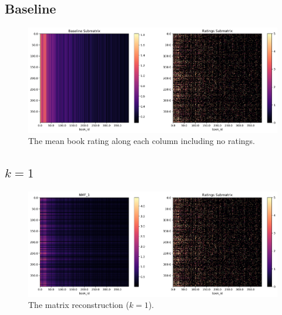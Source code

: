 \documentclass[handout]{beamer}
\begin{document}
\subsection{Baseline}\label{baseline}


\begin{frame}
 \begin{figure}[t]
    \includegraphics[width=\linewidth]{../image/goodreads-models/baseline-matrix.png}
    \caption[Baseline matrix]{The mean book rating along each column including no ratings.}
     \label{fig:baseline-matrix}
\end{figure}
\end{frame}

\subsection{$k=1$}\label{k-1}

\begin{frame}
 \begin{figure}[t]
    \includegraphics[width=\linewidth]{../image/goodreads-models/nmf-1-left.png}
    \caption[NMF-1]{The matrix reconstruction ($k=1$).}
     \label{fig:nmf-1}
\end{figure}
\end{frame}
\end{document}
